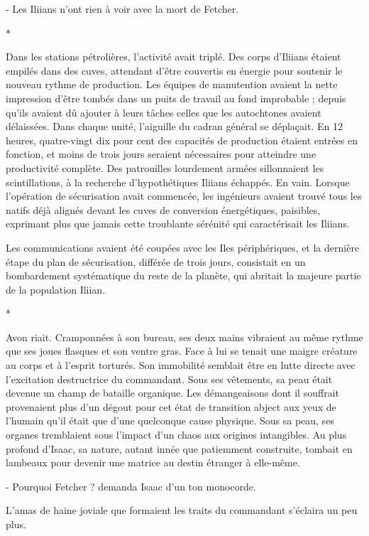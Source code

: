 \documentclass[12pt]{book}
\newcommand{\s}{\begin{center}
*
\end{center}
}
\begin{document}
- Les Iliians n'ont rien à voir avec la mort de Fetcher.


\s

Dans les stations pétrolières, l'activité avait triplé. Des corps d'Iliians étaient empilés dans des cuves, attendant d'être couvertis en énergie pour soutenir le nouveau rythme de production. Les équipes de manutention avaient la nette impression d'être tombés dans un puits de travail au fond improbable ; depuis qu'ils avaient dû ajouter à leurs tâches celles que les autochtones avaient délaissées. Dans chaque unité, l'aiguille du cadran général se déplaçait. En 12 heures, quatre-vingt dix pour cent des capacités de production étaient entrées en fonction, et moins de trois jours seraient nécessaires pour atteindre une productivité complète. Des patrouilles lourdement armées sillonnaient les scintillations, à la recherche d'hypothétiques Iliians échappés. En vain. Lorsque l'opération de sécurisation avait commencée, les ingénieurs avaient trouvé tous les natifs déjà alignés devant les cuves de conversion énergétiques, paisibles, exprimant plus que jamais cette troublante sérénité qui caractérisait les Iliians. 


Les communications avaient été coupées avec les Iles périphériques, et la dernière étape du plan de sécurisation, différée de trois jours, consistait en un bombardement systématique du reste de la planète, qui abritait la majeure partie de la population Iliian.


\s


Avon riait. Cramponnées à son bureau, ses deux mains vibraient au même rythme que ses joues flasques et son ventre gras. Face à lui se tenait une maigre créature au corps et à l'esprit torturés. Son immobilité semblait être en lutte directe avec l'excitation destructrice du commandant. Sous ses vêtements, sa peau était devenue un champ de bataille organique. Les démangeaisons dont il souffrait provenaient plus d'un dégout pour cet état de transition abject aux yeux de l'humain qu'il était que d'une quelconque cause physique. Sous sa peau, ses organes tremblaient sous l'impact d'un chaos aux origines intangibles. Au plus profond d'Isaac, sa nature, autant innée que patiemment construite, tombait en lambeaux pour devenir une matrice au destin étranger à elle-même.


- Pourquoi Fetcher ? demanda Isaac d'un ton monocorde.


L'amas de haine joviale que formaient les traits du commandant s'éclaira un peu plus.
\end{document}
